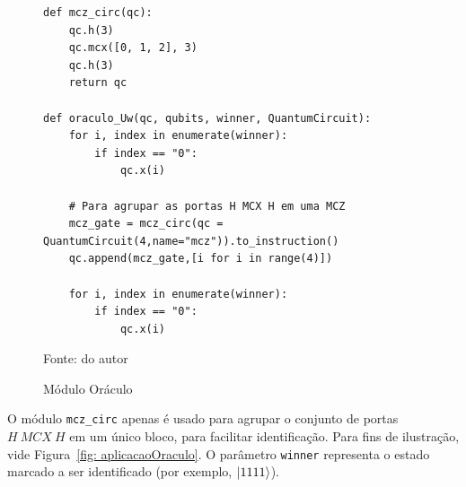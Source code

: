 \begin{figure}[!thb]
\centering
\caption{Módulo Oráculo} 
\begin{verbatim}
def mcz_circ(qc):
    qc.h(3)
    qc.mcx([0, 1, 2], 3)
    qc.h(3)
    return qc
    
def oraculo_Uw(qc, qubits, winner, QuantumCircuit):
    for i, index in enumerate(winner):
        if index == "0":
            qc.x(i)

    # Para agrupar as portas H MCX H em uma MCZ
    mcz_gate = mcz_circ(qc = QuantumCircuit(4,name="mcz")).to_instruction() 
    qc.append(mcz_gate,[i for i in range(4)])

    for i, index in enumerate(winner):
        if index == "0":
            qc.x(i)
\end{verbatim} 
{\small Fonte: do autor} 
\label{cod: oraculo} 
\end{figure}

O módulo \verb|mcz_circ| apenas é usado para agrupar o conjunto de portas $H~MCX~H$ em um único bloco, para facilitar identificação. Para fins de ilustração, vide Figura~\ref{fig: aplicacaoOraculo}. O parâmetro \texttt{winner} representa o estado marcado a ser identificado (por exemplo, $\ket{1111}$).

